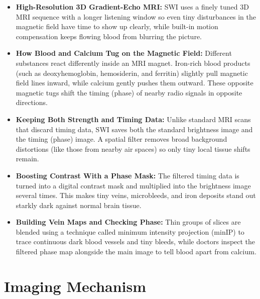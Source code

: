 \begin{itemize}
    \item \textbf{High-Resolution 3D Gradient-Echo MRI:} SWI uses a finely tuned 3D MRI sequence with a longer listening window so even tiny disturbances in the magnetic field have time to show up clearly, while built-in motion compensation keeps flowing blood from blurring the picture.
    \item \textbf{How Blood and Calcium Tug on the Magnetic Field:} Different substances react differently inside an MRI magnet. Iron-rich blood products (such as deoxyhemoglobin, hemosiderin, and ferritin) slightly pull magnetic field lines inward, while calcium gently pushes them outward. These opposite magnetic tugs shift the timing (phase) of nearby radio signals in opposite directions.
    \item \textbf{Keeping Both Strength and Timing Data:} Unlike standard MRI scans that discard timing data, SWI saves both the standard brightness image and the timing (phase) image. A spatial filter removes broad background distortions (like those from nearby air spaces) so only tiny local tissue shifts remain.
    \item \textbf{Boosting Contrast With a Phase Mask:} The filtered timing data is turned into a digital contrast mask and multiplied into the brightness image several times. This makes tiny veins, microbleeds, and iron deposits stand out starkly dark against normal brain tissue.
    \item \textbf{Building Vein Maps and Checking Phase:} Thin groups of slices are blended using a technique called minimum intensity projection (minIP) to trace continuous dark blood vessels and tiny bleeds, while doctors inspect the filtered phase map alongside the main image to tell blood apart from calcium.
\end{itemize}

\section{Imaging Mechanism}

